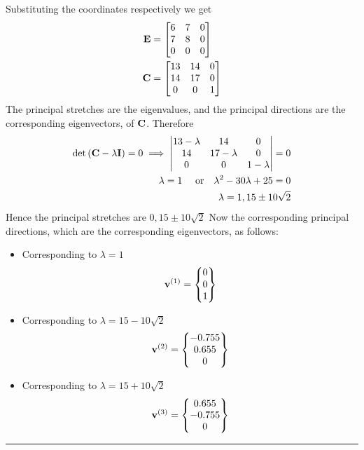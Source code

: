 Substituting the coordinates respectively we get
\begin{align*}
{\bf E}
& =
\begin{bmatrix}
6 & 7 & 0\\
7 & 8 & 0\\
0 & 0 & 0
\end{bmatrix}\\
{\bf C}
& =
\begin{bmatrix}
13 & 14 & 0\\
14 & 17 & 0\\
0 & 0 & 1
\end{bmatrix}
\end{align*}
The principal stretches are the eigenvalues, and the principal directions are the corresponding eigenvectors, of $\bf C$. Therefore
\begin{align*}
\det\left({\bf C}-\lambda{\bf I}\right) = 0
\implies 
\begin{vmatrix}
13-\lambda & 14 & 0\\
14 & 17-\lambda & 0\\
0 & 0 & 1-\lambda
\end{vmatrix} = 0 \\ 
\lambda = 1\ \ \ \ \text{or}\ \ \ \lambda^2 - 30\lambda + 25 = 0 \\
\lambda = 1,15\pm10\sqrt{2}
\end{align*}
Hence the principal stretches are $0,15\pm10\sqrt{2}$
Now the corresponding principal directions, which are the corresponding eigenvectors, as follows: 
\begin{itemize}
\item Corresponding to $\lambda = 1$
\begin{align*}
{\bf v}^{(1)}
=
\begin{Bmatrix}
0\\0\\1
\end{Bmatrix}
\end{align*}
\item Corresponding to $\lambda=15-10\sqrt{2}$
\begin{align*}
{\bf v}^{(2)}
=
\begin{Bmatrix}
-0.755\\0.655\\0
\end{Bmatrix}
\end{align*}
\item Corresponding to $\lambda = 15+10\sqrt{2}$
\begin{align*}
{\bf v}^{(3)}
=
\begin{Bmatrix}
0.655\\-0.755\\0
\end{Bmatrix}
\end{align*}
\end{itemize}\hrule
